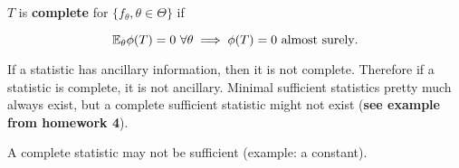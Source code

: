 \begin{definition}

\(T\) is \textbf{complete} for \(\{f_\theta, \theta \in \Theta\}\) if

\[
\E_\theta \phi(T) = 0 \ \forall \theta \implies \phi(T) = 0 \text{ almost surely}.
\]

\end{definition}

\begin{remark} If a statistic has ancillary information, then it is not complete. Therefore if a statistic is complete, it is not ancillary. Minimal sufficient statistics pretty much always exist, but a complete sufficient statistic might not exist (\textbf{see example from homework 4}).
\end{remark}

\begin{remark}A complete statistic may not be sufficient (example: a constant).

\end{remark}

